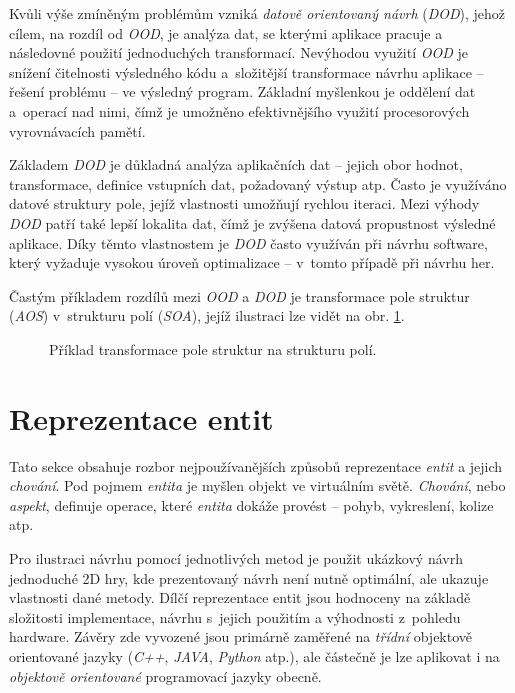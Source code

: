 Kvůli výše zmíněným problémům vzniká \emph{datově orientovaný návrh}\cite{DOD} (\emph{DOD}), jehož cílem, na rozdíl od \emph{OOD}, je analýza dat, se kterými aplikace pracuje a následovné použití jednoduchých transformací. Nevýhodou využití \emph{OOD} je snížení čitelnosti výsledného kódu a~složitější transformace návrhu aplikace -- řešení problému -- ve výsledný program. Základní myšlenkou je oddělení dat a~operací nad nimi, čímž je umožněno efektivnějšího využití procesorových vyrovnávacích pamětí.

Základem \emph{DOD} je důkladná analýza aplikačních dat -- jejich obor hodnot, transformace, definice vstupních dat, požadovaný výstup atp. Často je využíváno datové struktury pole, jejíž vlastnosti umožňují rychlou iteraci. Mezi výhody \emph{DOD} patří také lepší lokalita dat, čímž je zvýšena datová propustnost výsledné aplikace. Díky těmto vlastnostem je \emph{DOD} často využíván při návrhu software, který vyžaduje vysokou úroveň optimalizace -- v~tomto případě při návrhu her\cite{DataOrientedDesignDice, DataOrientedDesignCppCon}.

Častým příkladem rozdílů mezi \emph{OOD} a \emph{DOD} je transformace pole struktur (\emph{AOS}) v~strukturu polí (\emph{SOA}), jejíž ilustraci lze vidět na obr. \ref{Fig:SOAASO}.

\begin{figure}[]
	\centering
	\caption{Příklad transformace pole struktur na strukturu polí.}
	\label{Fig:SOAASO}
\end{figure}


\section{Reprezentace entit}
\label{Chap:Representation}

Tato sekce obsahuje rozbor nejpoužívanějších způsobů reprezentace \emph{entit} \cite{EvolveHierarchy} a jejich \emph{chování}. Pod pojmem \emph{entita} je myšlen objekt ve virtuálním světě. \emph{Chování}, nebo \emph{aspekt}, definuje operace, které \emph{entita} dokáže provést -- pohyb, vykreslení, kolize atp.

Pro ilustraci návrhu pomocí jednotlivých metod je použit ukázkový návrh jednoduché 2D  hry, kde prezentovaný návrh není nutně optimální, ale ukazuje vlastnosti dané metody. Dílčí reprezentace entit jsou hodnoceny na základě složitosti implementace, návrhu s~jejich použitím a výhodnosti z~pohledu hardware. Závěry zde vyvozené jsou primárně zaměřené na \emph{třídní} objektově orientované jazyky (\emph{C++}, \emph{JAVA}, \emph{Python} atp.), ale částečně je lze aplikovat i na \emph{objektově orientované} programovací jazyky obecně.

